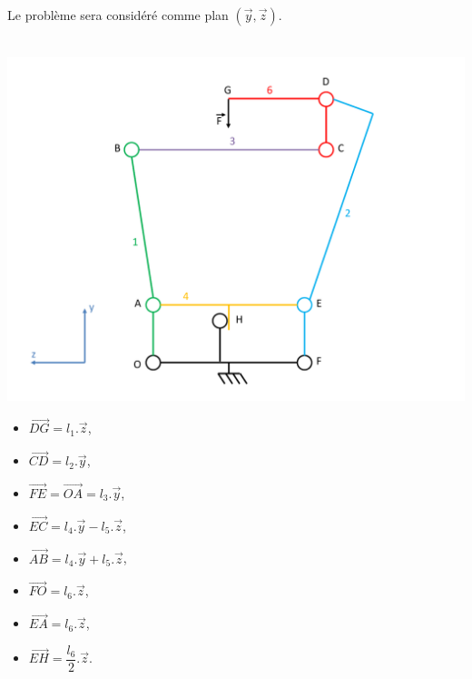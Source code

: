 Le problème sera considéré comme plan $(\overrightarrow{y},\overrightarrow{z})$.
\\ ~\ \\
\begin{minipage}{0.65\linewidth}
 \centering \includegraphics[width=1\linewidth]{img/Figure_stat_2}
\end{minipage}
\hfill
\begin{minipage}{0.3\linewidth}
\begin{itemize}
 \item $\overrightarrow{DG}=l_1.\overrightarrow{z}$,
 \item $\overrightarrow{CD}=l_2.\overrightarrow{y}$,
 \item $\overrightarrow{FE}=\overrightarrow{OA}=l_3.\overrightarrow{y}$,
 \item $\overrightarrow{EC}=l_4.\overrightarrow{y}-l_5.\overrightarrow{z}$,
 \item $\overrightarrow{AB}=l_4.\overrightarrow{y}+l_5.\overrightarrow{z}$,
 \item $\overrightarrow{FO}=l_6.\overrightarrow{z}$,
 \item $\overrightarrow{EA}=l_6.\overrightarrow{z}$,
 \item $\overrightarrow{EH}=\dfrac{l_6}{2}.\overrightarrow{z}$.
\end{itemize}
\end{minipage}

